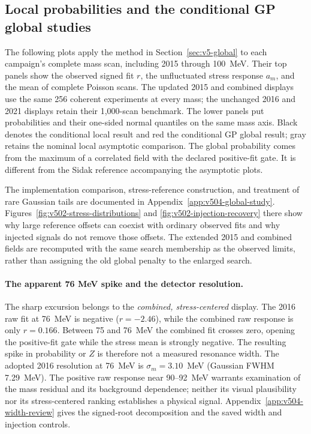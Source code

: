 \subsection{Local probabilities and the conditional GP global studies}
\label{sec:v5-global-results}

The following plots apply the method in Section~\ref{sec:v5-global} to each
campaign's complete mass scan, including 2015 through 100~MeV. Their top panels show the observed signed fit
$r$, the unfluctuated stress response $a_m$, and the mean of complete Poisson scans. The updated 2015 and combined
displays use the same 256 coherent experiments at every mass; the unchanged
2016 and 2021 displays retain their 1,000-scan benchmark. The lower panels put probabilities and their one-sided normal
quantiles on the same mass axis. Black denotes the conditional local result
and red the conditional GP global result; gray retains the nominal local
asymptotic comparison. The global probability comes from the maximum of a
correlated field with the declared positive-fit gate. It is different from
the Sidak reference accompanying the asymptotic plots.


The implementation comparison, stress-reference construction, and treatment of
rare Gaussian tails are documented in Appendix~\ref{app:v504-global-study}.
Figures~\ref{fig:v502-stress-distributions} and
\ref{fig:v502-injection-recovery} there show why large reference offsets can
coexist with ordinary observed fits and why injected signals do not remove
those offsets. The extended 2015 and combined fields are recomputed with the
same search membership as the observed limits, rather than assigning the old
global penalty to the enlarged search.

\paragraph{The apparent 76 MeV spike and the detector resolution.}
The sharp excursion belongs to the \emph{combined, stress-centered} display.
The 2016 raw fit at 76~MeV is negative ($r=-2.46$), while the combined raw
response is only $r=0.166$. Between 75 and 76~MeV the combined fit crosses
zero, opening the positive-fit gate while the stress mean is strongly
negative. The resulting spike in probability or $Z$ is therefore not a
measured resonance width. The adopted 2016 resolution at 76~MeV is
$\sigma_m=3.10$~MeV (Gaussian FWHM 7.29~MeV). The positive raw response near
90--92~MeV warrants examination of the mass residual and its background
dependence; neither its visual plausibility nor its stress-centered ranking
establishes a physical signal. Appendix~\ref{app:v504-width-review} gives
the signed-root decomposition and the saved width and injection controls.

